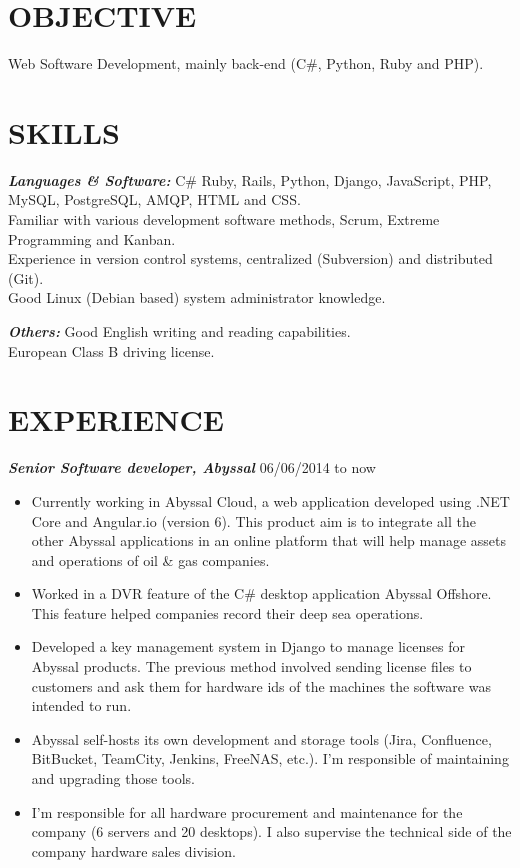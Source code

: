\documentclass[line,margin]{resume}
\begin{document}
\address{Currently living in Porto, Portugal}
\address{helder.tavares.silva@gmail.com or +351917534732}

\begin{resume}

\section{OBJECTIVE} Web Software Development, mainly back-end (C\#, Python, Ruby and PHP).

\section{SKILLS}
    {\sl\bf Languages \& Software:}
        C\# Ruby, Rails, Python, Django, JavaScript, PHP, MySQL, PostgreSQL, AMQP, HTML and CSS.\\
        Familiar with various development software methods, Scrum, Extreme Programming and Kanban.\\
        Experience in version control systems, centralized (Subversion) and distributed (Git).\\
        Good Linux (Debian based) system administrator knowledge.

    {\sl\bf Others:}
        Good English writing and reading capabilities.\\
        European Class B driving license.

\section{EXPERIENCE}
    {\sl\bf Senior Software developer, Abyssal} \hfill 06/06/2014 to now
    \begin{itemize}
		\item Currently working in Abyssal Cloud, a web application developed using .NET Core and Angular.io (version 6). This product aim is to integrate all the other Abyssal applications in an online platform that will help manage assets and operations of oil \& gas companies.
        \item Worked in a DVR feature of the C\# desktop application Abyssal Offshore. This feature helped companies record their deep sea operations.
		\item Developed a key management system in Django to manage licenses for Abyssal products. The previous method involved sending license files to customers and ask them for hardware ids of the machines the software was intended to run.
		\item Abyssal self-hosts its own development and storage tools (Jira, Confluence, BitBucket, TeamCity, Jenkins, FreeNAS, etc.). I'm responsible of maintaining and upgrading those tools.
		\item I’m responsible for all hardware procurement and maintenance for the company (6 servers and 20 desktops). I also supervise the technical side of the company hardware sales division.
    \end{itemize}


\end{resume}
\end{document}
